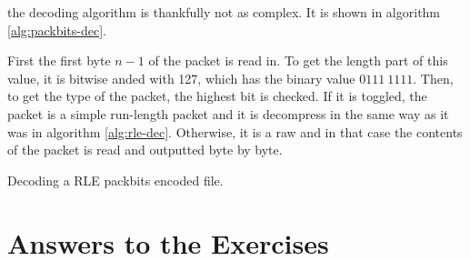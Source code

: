the decoding algorithm is thankfully not as complex. It is shown in
algorithm \ref{alg:packbits-dec}.

First the first byte $n-1$ of the packet is read in. To get the length
part of this value, it is bitwise anded with 127, which has the binary
value $0111\ 1111$.  Then, to get the type of the packet, the highest
bit is checked. If it is toggled, the packet is a simple run-length
packet and it is decompress in the same way as it was in algorithm
\ref{alg:rle-dec}. Otherwise, it is a raw and in that case the
contents of the packet is read and outputted byte by byte.

\begin{algorithm}
  \caption{Decoding a RLE packbits encoded file.}
  \label{alg:packbits-dec}
  \begin{algorithmic}[1]


    \While{\neof}



        \State {}
        \EndRepeatn
      \Else

        \State {}
        \EndRepeatn

      \EndIf


    \EndWhile
  \end{algorithmic}
\end{algorithm}

\section{Answers to the Exercises}


